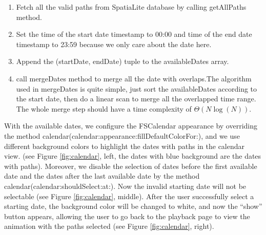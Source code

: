 \documentclass[12pt,a4paper]{article}
\renewcommand\texttt[1]{{\ttfamily\color{textttColor}#1}}
\begin{document}
                \begin{enumerate}
                    \item Fetch all the valid paths from SpatiaLite database by calling \texttt{getAllPaths} method.
                    \item Set the time of the start date timestamp to 00:00 and time of the end date timestamp to 23:59 because we only care about the date here.
                    \item Append the \texttt{(startDate, endDate)} tuple to the \texttt{availableDates} array.
                    \item call \texttt{mergeDates} method to merge all the date with overlaps.The algorithm used in \texttt{mergeDates} is quite simple, just sort the \texttt{availableDates} according to the start date, then do a linear scan to merge all the overlapped time range. The whole merge step should have a time complexity of $\Theta(N\log(N))$.
                \end{enumerate}
                
                With the available dates, we configure the \texttt{FSCalendar} appearance by overriding the method \texttt{calendar(calendar:appearance:fillDefaultColorFor:)}, and we use different background colors to highlight the dates with paths in the calendar view. (see Figure \ref{fig:calendar}, left, the dates with blue background are the dates with paths). Moreover, we disable the selection of dates before the first available date and the dates after the last available date by the method \texttt{calendar(calendar:shouldSelect:at:)}. Now the invalid starting date will not be selectable (see Figure \ref{fig:calendar}, middle). After the user successfully select a starting date, the background color will be changed to white, and now the ``show'' button appears, allowing the user to go back to the playback page to view the animation with the paths selected (see Figure \ref{fig:calendar}, right).
                
\end{document}
